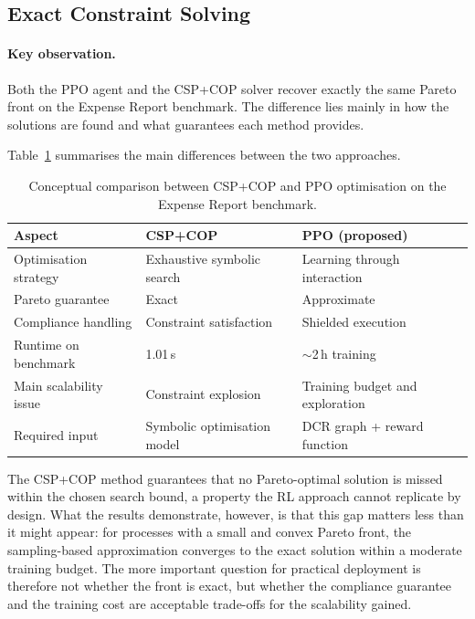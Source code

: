 \subsection{Exact Constraint Solving}
\label{sec:discussion_csp_comparison}

\paragraph{Key observation.} Both the \ac{PPO} agent and the CSP+COP solver recover exactly the same Pareto front on the Expense Report benchmark. The difference lies mainly in how the solutions are found and what guarantees each method provides.

Table~\ref{tab:method_comparison} summarises the main differences between the two approaches.

\begin{table}[H]
\centering
\caption{Conceptual comparison between CSP+COP and PPO optimisation
         on the Expense Report benchmark.}
\label{tab:method_comparison}
\setlength{\arrayrulewidth}{0.4pt}
\renewcommand{\arraystretch}{1.4}
\begin{tabular}{@{} p{3.5cm} p{5cm} p{5cm} @{}}
\toprule
\textbf{Aspect} & \textbf{CSP+COP} & \textbf{PPO (proposed)} \\
\midrule
Optimisation strategy &
Exhaustive symbolic search &
Learning through interaction \\

\addlinespace
Pareto guarantee &
Exact &
Approximate \\

\addlinespace
Compliance handling &
Constraint satisfaction &
Shielded execution \\

\addlinespace
Runtime on benchmark &
1.01\,s &
$\sim$2\,h training \\

\addlinespace
Main scalability issue &
Constraint explosion &
Training budget and exploration \\

\addlinespace
Required input &
Symbolic optimisation model &
DCR graph + reward function \\

\bottomrule
\end{tabular}
\end{table}

The CSP+COP method guarantees that no Pareto-optimal solution is missed within the chosen search bound, a property the \ac{RL} approach cannot replicate by design. What the results demonstrate, however, is that this gap matters less than it might appear: for processes with a small and convex Pareto front, the sampling-based approximation converges to the exact solution within a moderate training budget. The more important question for practical deployment is therefore not whether the front is exact, but whether the compliance guarantee and the training cost are acceptable trade-offs for the scalability gained.

